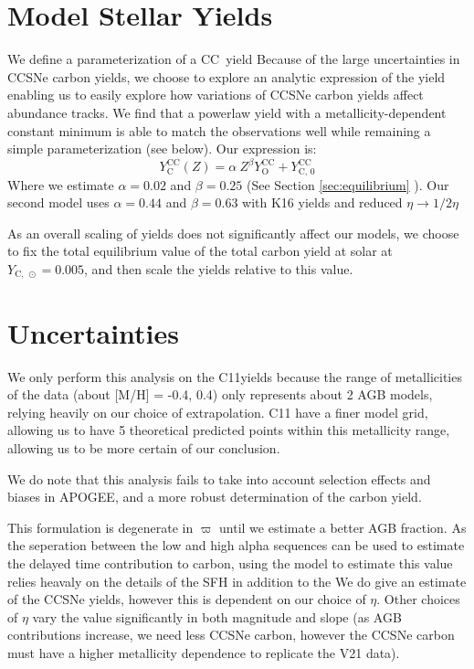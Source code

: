 \documentclass[12pt,oneside]{report}
\newcommand{\sun}{\ensuremath{\odot}}
\begin{document}
\section{Model Stellar Yields}
We define a parameterization of a CC~yield
  Because of the large uncertainties in CCSNe carbon yields, we choose to explore an analytic expression of the yield enabling us to easily explore how variations of CCSNe carbon yields affect abundance tracks. We find that a powerlaw yield with a metallicity-dependent constant minimum is able to match the observations well while remaining a simple parameterization (see below). Our expression is:
  \begin{equation}\label{eq:y_yields}
   Y_\text{C}^\text{CC}(Z) =  \alpha\ Z^\beta Y_\text{O}^\text{CC} + Y_\text{C, 0}^\text{CC}
    \end{equation}
   	Where we estimate $\alpha = 0.02$ and $\beta = 0.25$ (See Section \ref{sec:equilibrium} ). Our second model uses $\alpha = 0.44$ and $\beta = 0.63$ with K16 yields and reduced $\eta \rightarrow 1/2 \eta$ 
    
    As an overall scaling of yields does not significantly affect our models, we choose to fix the total equilibrium value of the total carbon yield at solar at $Y_{\text{C},\ \sun} = 0.005$, and then scale the yields relative to this value. 


\section{Uncertainties}

We only perform this analysis on the C11yields because the range of metallicities of the data (about [M/H] = -0.4, 0.4) only represents about 2 AGB models, relying heavily on our choice of extrapolation. C11 have a finer model grid, allowing us to have 5 theoretical predicted points within this metallicity range, allowing us to be more certain of our conclusion. 

We do note that this analysis fails to take into account selection effects and biases in APOGEE, and a more robust determination of the carbon yield. 


This formulation is degenerate in $\varpi$ until we estimate a better AGB fraction. As the seperation between the low and high alpha sequences can be used to estimate the delayed time contribution to carbon, using the model to estimate this value relies heavaly on the details of the SFH in addition to the 
We do give an estimate of the CCSNe yields, however this is dependent on our choice of $\eta$. Other choices of $\eta$ vary the value significantly in both magnitude and slope (as AGB contributions increase, we need less CCSNe carbon, however the CCSNe carbon must have a higher metallicity dependence to replicate the V21 data). 
\end{document}
